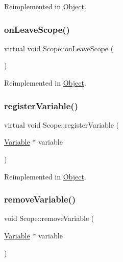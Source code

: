 Reimplemented in \hyperlink{classObject_a61b4cd86dd434abf07e3f4d19b5c93eb}{Object}.

\mbox{\label{classScope_acff92230877eb8ff60f27c86ac56e929}} 
\subsubsection{\texorpdfstring{on\+Leave\+Scope()}{onLeaveScope()}}
{\footnotesize\ttfamily virtual void Scope\+::on\+Leave\+Scope (\begin{DoxyParamCaption}{ }\end{DoxyParamCaption})\hspace{0.3cm}{\ttfamily [virtual]}}



Reimplemented in \hyperlink{classObject_a54a99563b5936626d47fb1e2f0e13a9c}{Object}.

\mbox{\label{classScope_a4c2622adf1835753f5233869febd80d4}} 
\subsubsection{\texorpdfstring{register\+Variable()}{registerVariable()}}
{\footnotesize\ttfamily virtual void Scope\+::register\+Variable (\begin{DoxyParamCaption}\item[{\hyperlink{classVariable}{Variable} $\ast$}]{variable }\end{DoxyParamCaption})\hspace{0.3cm}{\ttfamily [virtual]}}



Reimplemented in \hyperlink{classObject_ad8f3631de109f50f94432ae9e1f7a130}{Object}.

\mbox{\label{classScope_a5fe1e6e8c81549eec1ff4dfca7001a69}} 
\subsubsection{\texorpdfstring{remove\+Variable()}{removeVariable()}}
{\footnotesize\ttfamily void Scope\+::remove\+Variable (\begin{DoxyParamCaption}\item[{\hyperlink{classVariable}{Variable} $\ast$}]{variable }\end{DoxyParamCaption})}



